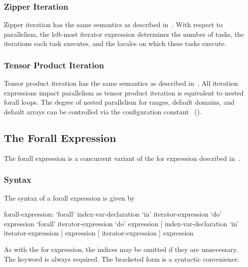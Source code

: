 \subsubsection{Zipper Iteration}
\label{forall_zipper}

Zipper iteration has the same semantics as described
in~.  With respect to parallelism, the
left-most iterator expression determines the number of tasks, the
iterations each task executes, and the locales on which these tasks
execute.

\subsubsection{Tensor Product Iteration}
\label{forall_tensor}

Tensor product iteration has the same semantics as described
in~.  All iteration expressions impact
parallelism as tensor product iteration is equivalent to nested forall
loops.  The degree of nested parallelism for ranges, default domains,
and default arrays can be controlled via the configuration
constant ~().

\subsection{The Forall Expression}
\label{Forall_Expressions}

The forall expression is a concurrent variant of the for expression
described in~.

\subsubsection{Syntax}
\label{forall_expr_syntax}

The syntax of a forall expression is given by
\begin{syntax}
forall-expression:
  `forall' index-var-declaration `in' iterator-expression `do' expression
  `forall' iterator-expression `do' expression
  [ index-var-declaration `in' iterator-expression ] expression
  [ iterator-expression ] expression
\end{syntax}
As with the for expression, the indices may be omitted if they are
unnecessary.  The  keyword is always required.  The bracketed
form is a syntactic convenience.

